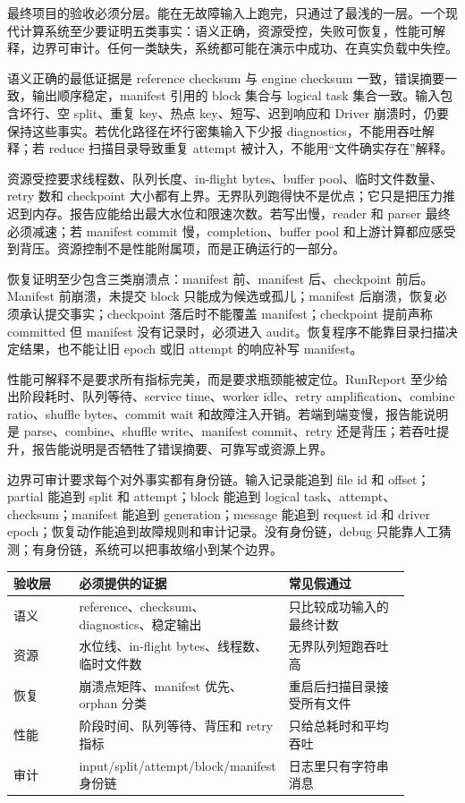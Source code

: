 最终项目的验收必须分层。能在无故障输入上跑完，只通过了最浅的一层。一个现代计算系统至少要证明五类事实：语义正确，资源受控，失败可恢复，性能可解释，边界可审计。任何一类缺失，系统都可能在演示中成功、在真实负载中失控。

语义正确的最低证据是 reference checksum 与 engine checksum 一致，错误摘要一致，输出顺序稳定，manifest 引用的 block 集合与 logical task 集合一致。输入包含坏行、空 split、重复 key、热点 key、短写、迟到响应和 Driver 崩溃时，仍要保持这些事实。若优化路径在坏行密集输入下少报 diagnostics，不能用吞吐解释；若 reduce 扫描目录导致重复 attempt 被计入，不能用“文件确实存在”解释。

资源受控要求线程数、队列长度、in-flight bytes、buffer pool、临时文件数量、retry 数和 checkpoint 大小都有上界。无界队列跑得快不是优点；它只是把压力推迟到内存。报告应能给出最大水位和限速次数。若写出慢，reader 和 parser 最终必须减速；若 manifest commit 慢，completion、buffer pool 和上游计算都应感受到背压。资源控制不是性能附属项，而是正确运行的一部分。

恢复证明至少包含三类崩溃点：manifest 前、manifest 后、checkpoint 前后。Manifest 前崩溃，未提交 block 只能成为候选或孤儿；manifest 后崩溃，恢复必须承认提交事实；checkpoint 落后时不能覆盖 manifest；checkpoint 提前声称 committed 但 manifest 没有记录时，必须进入 audit。恢复程序不能靠目录扫描决定结果，也不能让旧 epoch 或旧 attempt 的响应补写 manifest。

性能可解释不是要求所有指标完美，而是要求瓶颈能被定位。RunReport 至少给出阶段耗时、队列等待、service time、worker idle、retry amplification、combine ratio、shuffle bytes、commit wait 和故障注入开销。若端到端变慢，报告能说明是 parse、combine、shuffle write、manifest commit、retry 还是背压；若吞吐提升，报告能说明是否牺牲了错误摘要、可靠写或资源上界。

边界可审计要求每个对外事实都有身份链。输入记录能追到 file id 和 offset；partial 能追到 split 和 attempt；block 能追到 logical task、attempt、checksum；manifest 能追到 generation；message 能追到 request id 和 driver epoch；恢复动作能追到故障规则和审计记录。没有身份链，debug 只能靠人工猜测；有身份链，系统可以把事故缩小到某个边界。

\begin{center}
\small
\begin{tabular}{@{}p{0.18\linewidth}p{0.36\linewidth}p{0.34\linewidth}@{}}
\toprule
验收层 & 必须提供的证据 & 常见假通过 \\
\midrule
语义 & reference、checksum、diagnostics、稳定输出 & 只比较成功输入的最终计数 \\
资源 & 水位线、in-flight bytes、线程数、临时文件数 & 无界队列短跑吞吐高 \\
恢复 & 崩溃点矩阵、manifest 优先、orphan 分类 & 重启后扫描目录接受所有文件 \\
性能 & 阶段时间、队列等待、背压和 retry 指标 & 只给总耗时和平均吞吐 \\
审计 & input/split/attempt/block/manifest 身份链 & 日志里只有字符串消息 \\
\bottomrule
\end{tabular}
\end{center}


